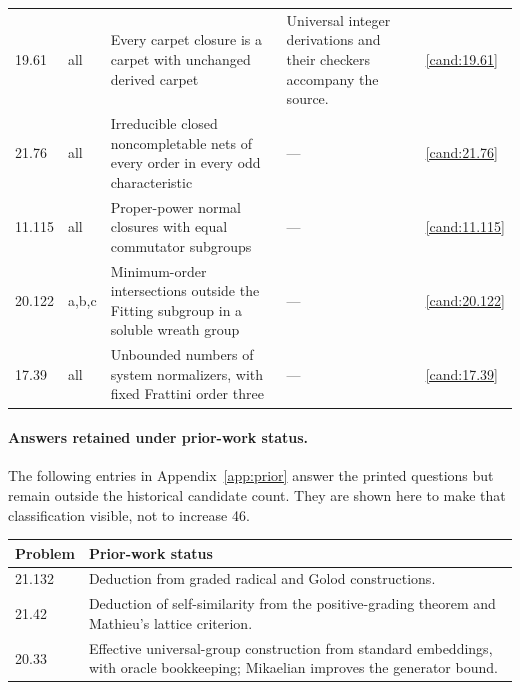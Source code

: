 \begin{longtable}{@{}p{}p{}>{\raggedright\arraybackslash}p{}>{\raggedright\arraybackslash}p{}p{}@{}}
19.61 & all & Every carpet closure is a carpet with unchanged derived carpet & Universal integer derivations and their checkers accompany the source. & \ref{cand:19.61} \\
21.76 & all & Irreducible closed noncompletable nets of every order in every odd characteristic & --- & \ref{cand:21.76} \\
11.115 & all & Proper-power normal closures with equal commutator subgroups & --- & \ref{cand:11.115} \\
20.122 & a,b,c & Minimum-order intersections outside the Fitting subgroup in a soluble wreath group & --- & \ref{cand:20.122} \\
17.39 & all & Unbounded numbers of system normalizers, with fixed Frattini order three & --- & \ref{cand:17.39} \\
\end{longtable}
\normalsize

\paragraph{Answers retained under prior-work status.}
The following entries in Appendix~\ref{app:prior} answer the printed
questions but remain outside the historical candidate count. They are
shown here to make that classification visible, not to increase 46.
\begin{center}\small
\begin{tabular}{@{}lp{}@{}}\toprule
Problem & Prior-work status\\\midrule
21.132 & Deduction from graded radical and Golod constructions.\\
21.42 & Deduction of self-similarity from the positive-grading theorem and Mathieu's lattice criterion.\\
20.33 & Effective universal-group construction from standard embeddings, with oracle bookkeeping; Mikaelian improves the generator bound.\\
\bottomrule\end{tabular}\end{center}
